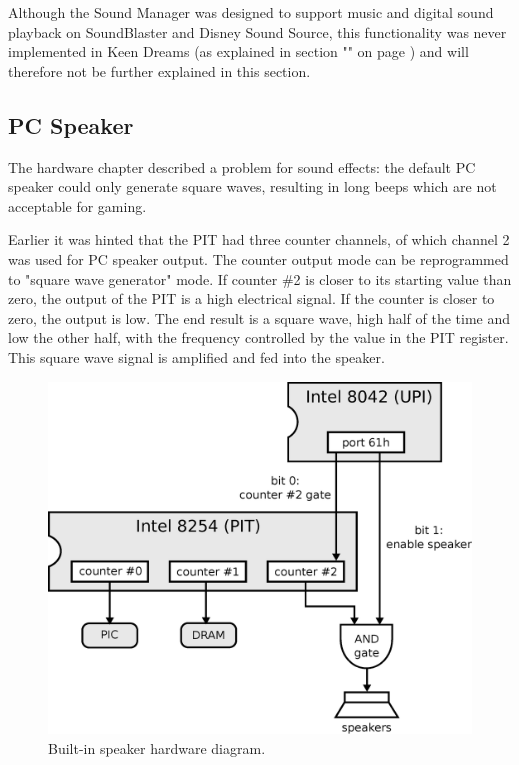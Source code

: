 \documentclass[book.tex]{subfiles}
\begin{document}
\par
Although the Sound Manager was designed to support music and digital sound playback on SoundBlaster and Disney Sound Source, this functionality was never implemented in Keen Dreams (as explained in section "" on page \pageref{section:audio}) and will therefore not be further explained in this section.\\

\begin{minipage}{\textwidth}

\end{minipage}



\subsection{PC Speaker}
The hardware chapter described a problem for sound effects: the default PC speaker could only generate square waves, resulting in long beeps which are not acceptable for gaming.\\

\par
Earlier it was hinted that the PIT had three counter channels, of which channel 2 was used for PC speaker output. The counter output mode can be reprogrammed to "square wave generator" mode. If counter \#2 is closer to its starting value than zero, the output of the PIT is a high electrical signal. If the counter is closer to zero, the output is low. The end result is a square wave, high half of the time and low the other half, with the frequency controlled by the value in the PIT register. This square wave signal is amplified and fed into the speaker. \\

\par
\begin{figure}[H]
  \centering
  \includegraphics[width=1.0\textwidth]{imgs/drawings/pc_speaker.eps}
  \caption{Built-in speaker hardware diagram.}
  \label{fig:pc_speaker}
\end{figure}
\end{document}
